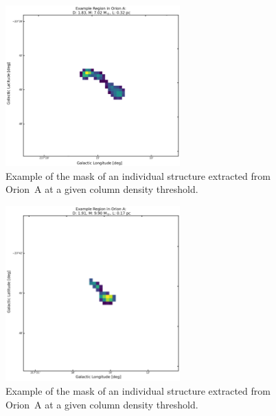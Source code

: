 \begin{figure}[h]
    \centering
    \includegraphics[width=0.6\textwidth]{figures/MSD_Gallery_Orion_A_3.png}
    \caption{Example of the mask of an individual structure extracted from Orion~A at a given column density threshold.}
    \label{fig:gallery_MSD_A_3}
\end{figure}

\begin{figure}[h]
    \centering
    \includegraphics[width=0.6\textwidth]{figures/MSD_Gallery_Orion_A_4.png}
    \caption{Example of the mask of an individual structure extracted from Orion~A at a given column density threshold.}
    \label{fig:gallery_MSD_A_4}
\end{figure}

